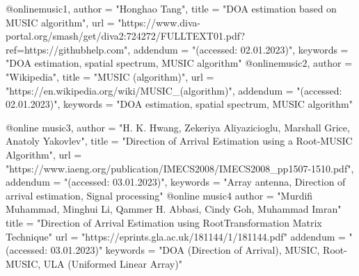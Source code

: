 @online{music1,
    author = "Honghao Tang",
    title = "DOA estimation based on MUSIC algorithm",
    url  = "https://www.diva-portal.org/smash/get/diva2:724272/FULLTEXT01.pdf?ref=https://githubhelp.com",
    addendum = "(accessed: 02.01.2023)",
    keywords = "DOA estimation, spatial spectrum, MUSIC algorithm"
}
@online{music2,
    author = "Wikipedia",
    title = "MUSIC (algorithm)",
    url = "https://en.wikipedia.org/wiki/MUSIC_(algorithm)",
    addendum = "(accessed: 02.01.2023)",
    keywords = "DOA estimation, spatial spectrum, MUSIC algorithm"
}

@online{
    music3,
    author = "H. K. Hwang, Zekeriya Aliyazicioglu, Marshall Grice, Anatoly Yakovlev",
    title = "Direction of Arrival Estimation using a Root-MUSIC Algorithm",
    url = "https://www.iaeng.org/publication/IMECS2008/IMECS2008_pp1507-1510.pdf",
    addendum = "(accessed: 03.01.2023)",
    keywords = "Array antenna, Direction of arrival estimation, Signal processing"
}
@online{
	music4
	author = "Murdifi Muhammad, Minghui Li, Qammer H. Abbasi, Cindy Goh, Muhammad Imran"
	title = "Direction of Arrival Estimation using RootTransformation Matrix Technique"
	url = "https://eprints.gla.ac.uk/181144/1/181144.pdf"
	addendum = "(accessed: 03.01.2023)"
	keywords = "DOA (Direction of Arrival), MUSIC, Root-MUSIC, ULA (Uniformed Linear Array)"
}
